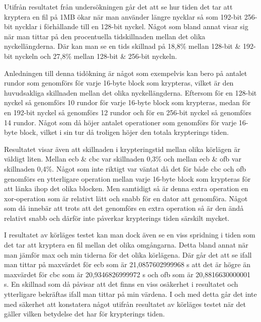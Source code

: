 \label{chap:discussion}

Utifrån resultatet från undersökningen går det att se hur tiden det tar att kryptera en fil på 1MB ökar när man använder längre nycklar så som 192-\gls{bit} 256-\gls{bit} nycklar
i förhållande till en 128-\gls{bit} nyckel. Något som bland annat visar sig när man tittar på den procentuella tidskillnaden mellan det olika nyckellängderna. Där kan man se en
tids skillnad på 18,8\% mellan 128-\gls{bit} \& 192-\gls{bit} nyckeln och 27,8\% mellan 128-\gls{bit} \& 256-\gls{bit} nyckeln.

Anledningen till denna tidökning är något som exempelvis kan bero på antalet rundor som genomförs för varje 16-\gls{byte} block som krypteras, vilket är den huvudsakliga
skillnaden mellan det olika nyckellängderna. Eftersom för en 128-\gls{bit} nyckel så genomförs 10 rundor för varje 16-\gls{byte} block som krypteras, medan för en 192-\gls{bit}
nyckel så genomförs 12 rundor och för en 256-\gls{bit} nyckel så genomförs 14 rundor. Något som då höjer antalet operationer som genomförs för varje 16-\gls{byte} block, vilket
i sin tur då troligen höjer den totala krypterings tiden.

Resultatet visar även att skillnaden i krypteringstid mellan olika körlägen är väldigt liten. Mellan \acrshort{ecb} \& \acrshort{cbc} var skillnaden 0,3\% och mellan \acrshort{ecb}
\& \acrshort{ofb} var skillnaden 0,4\%. Något som inte riktigt var väntat då det för både \acrshort{cbc} och \acrshort{ofb}
genomförs en ytterligare operation mellan varje 16-\gls{byte} block som krypteras för att länka ihop det olika blocken. Men samtidigt så är denna extra operation en \gls{xor}-operation
som är relativt lätt och snabb för en dator att genomföra. Något som då innebär att trots att det genomförs en extra operation så är den ändå relativt snabb och därför inte
påverkar krypterings tiden särskilt mycket.

I resultatet av körläges testet kan man dock även se en viss spridning i tiden som det tar att kryptera en fil mellan det olika omgångarna. Detta bland annat när man jämför
max och min tiderna för det olika körlägena. Där går det att se ifall man tittar på maxvärdet för \acrshort{ecb} som är 21,0857602999968 s att det är högre än
maxvärdet för \acrshort{cbc} som är 20,9346826999972 s och \acrshort{ofb} som är 20,8816630000001 s. En skillnad som då påvisar att det finns en viss osäkerhet i
resultatet och ytterligare bekräftas ifall man tittar på min värdena. I och med detta går det inte med säkerhet att konstatera något utifrån resultatet av körläges testet
när det gäller vilken betydelse det har för krypterings tiden.

